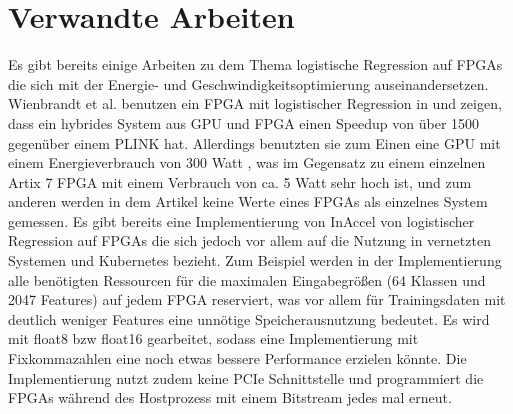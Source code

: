 \section{Verwandte Arbeiten}
Es gibt bereits einige Arbeiten zu dem Thema logistische Regression auf FPGAs die sich mit der Energie- und Geschwindigkeitsoptimierung auseinandersetzen.
Wienbrandt et al. benutzen ein FPGA mit logistischer Regression in \cite{WIENB} und zeigen, dass ein hybrides System aus GPU und FPGA einen Speedup von über 1500 gegenüber einem PLINK hat. Allerdings benutzten sie zum Einen eine GPU mit einem Energieverbrauch von 300 Watt \cite{P100}, was im Gegensatz zu einem einzelnen Artix 7 FPGA mit einem Verbrauch von ca. 5 Watt \cite{WAT} sehr hoch ist, und zum anderen werden in dem Artikel keine Werte eines FPGAs als einzelnes System gemessen.
Es gibt bereits eine Implementierung von InAccel von logistischer Regression auf FPGAs \cite{ACC} die sich jedoch vor allem auf die Nutzung in vernetzten Systemen und Kubernetes bezieht. Zum Beispiel werden in der Implementierung alle benötigten Ressourcen für die maximalen Eingabegrößen (64 Klassen und 2047 Features) auf jedem FPGA reserviert,
was vor allem für Trainingsdaten mit deutlich weniger Features eine unnötige Speicherausnutzung bedeutet. Es wird mit float8 bzw float16 gearbeitet, sodass eine Implementierung mit Fixkommazahlen eine noch etwas bessere Performance erzielen könnte. Die Implementierung nutzt zudem keine PCIe Schnittstelle und programmiert die FPGAs während des Hostprozess mit einem Bitstream jedes mal erneut.